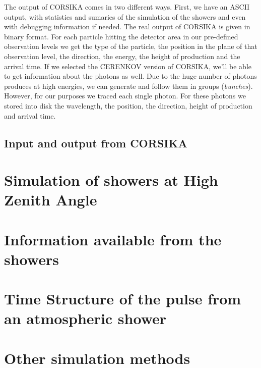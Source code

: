 The output of CORSIKA comes in two different ways. First, we have an
ASCII output, with statistics and sumaries of the simulation of the
showers and even with debugging information if needed.  The real
output of CORSIKA is given in binary format. For each particle hitting
the detector area in our pre-defined observation levels we get the
type of the particle, the position in the plane of that observation
level, the direction, the energy, the height of production and the
arrival time. If we selected the CERENKOV version of CORSIKA, we'll be
able to get information about the \Cherenkov photons as well. Due to
the huge number of \Cherenkov photons produces at high energies, we
can generate and follow them in groups (\emph{bunches}).  However, for
our purposes we traced each single \Cherenkov photon. For these
photons we stored into disk the wavelength, the position, the
direction, height of production and arrival time.


\MORE%

\subsection{Input and output from CORSIKA}
%

\section{Simulation of showers at High Zenith Angle}

\section{Information available from the showers}

\section{Time Structure of the \Cherenkov pulse from an atmospheric shower}

\section{Other simulation methods}
\label{sec:simothers}
\endinput
%
